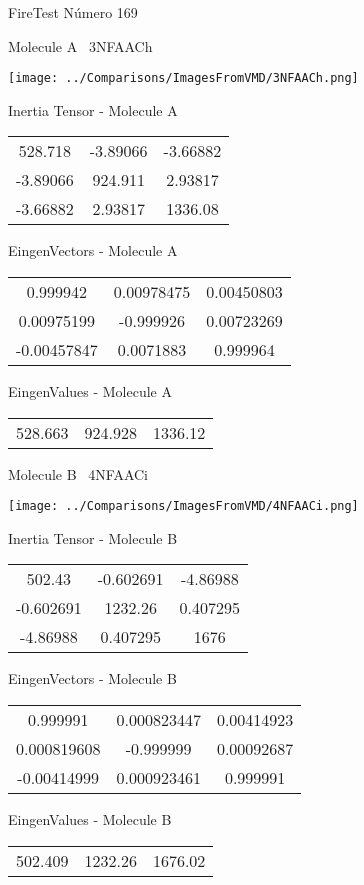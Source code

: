 \vtab[-3cm]
\begin{center}
{\large FireTest \tab Número 169}
\end{center}
\begin{multicols}{2}
\begin{center}

Molecule A \
3NFAACh

\texttt{[image: ../Comparisons/ImagesFromVMD/3NFAACh.png]}

Inertia Tensor - Molecule A \\
\begin{tabular}{|c c c|}
528.718	 & 	-3.89066	 & 	-3.66882	 \\
-3.89066	 & 	924.911	 & 	2.93817	 \\
-3.66882	 & 	2.93817	 & 	1336.08
\end{tabular}

\vtab
 EingenVectors - Molecule A     \\
\begin{tabular}{|c c c|}
0.999942	 & 	0.00978475	 & 	0.00450803	 \\
0.00975199	 & 	-0.999926	 & 	0.00723269	 \\
-0.00457847	 & 	0.0071883	 & 	0.999964
\end{tabular}

\vtab
 EingenValues - Molecule A     \\
\begin{tabular}{|c c c|}
528.663	 & 	924.928	 & 	1336.12	 \\
\end{tabular}
\columnbreak

Molecule B \
4NFAACi

\texttt{[image: ../Comparisons/ImagesFromVMD/4NFAACi.png]}

Inertia Tensor - Molecule B \\
\begin{tabular}{|c c c|}
502.43	 & 	-0.602691	 & 	-4.86988	 \\
-0.602691	 & 	1232.26	 & 	0.407295	 \\
-4.86988	 & 	0.407295	 & 	1676
\end{tabular}

\vtab
 EingenVectors - Molecule B     \\
\begin{tabular}{|c c c|}
0.999991	 & 	0.000823447	 & 	0.00414923	 \\
0.000819608	 & 	-0.999999	 & 	0.00092687	 \\
-0.00414999	 & 	0.000923461	 & 	0.999991
\end{tabular}

\vtab
 EingenValues - Molecule B     \\
\begin{tabular}{|c c c|}
502.409	 & 	1232.26	 & 	1676.02	 \\
\end{tabular}

\end{center}
\end{multicols}

